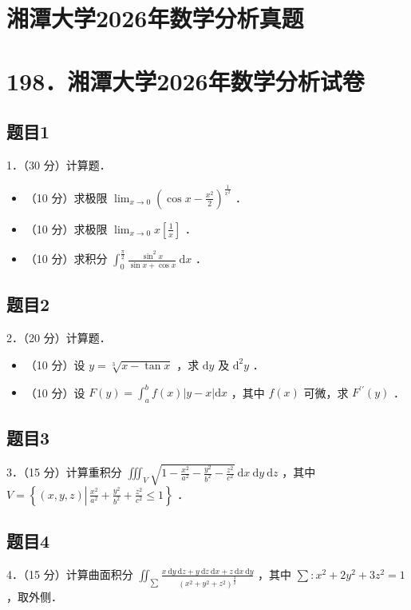 \documentclass{article}
\begin{document}
\section*{湘潭大学2026年数学分析真题}
\section*{198．湘潭大学2026年数学分析试卷}

\subsection{题目1}
1．（30 分）计算题．

\begin{itemize}
  \item[（1）] （10 分）求极限 \(\lim _{x \rightarrow 0}\left(\cos x-\frac{x^{2}}{2}\right)^{\frac{1}{x^{2}}}\) ．
  \item[（2）] （10 分）求极限 \(\lim _{x \rightarrow 0} x\left[\frac{1}{x}\right]\) ．
  \item[（3）] （10 分）求积分 \(\int_{0}^{\frac{\pi}{2}} \frac{\sin ^{2} x}{\sin x+\cos x} \mathrm{~d} x\) ．
\end{itemize}

\subsection{题目2}
2．（20 分）计算题．

\begin{itemize}
  \item[（1）] （10 分）设 \(y=\sqrt[3]{x-\tan x}\) ，求 \(\mathrm{d} y\) 及 \(\mathrm{d}^{2} y\) ．
  \item[（2）] （10 分）设 \(F(y)=\int_{a}^{b} f(x)|y-x| \mathrm{d} x\) ，其中 \(f(x)\) 可微，求 \(F^{\prime \prime}(y)\) ．
\end{itemize}

\subsection{题目3}
3．（15 分）计算重积分 \(\iiint_{V} \sqrt{1-\frac{x^{2}}{a^{2}}-\frac{y^{2}}{b^{2}}-\frac{z^{2}}{c^{2}}} \mathrm{~d} x \mathrm{~d} y \mathrm{~d} z\) ，其中 \(V=\left\{(x, y, z) \left\lvert\, \frac{x^{2}}{a^{2}}+\frac{y^{2}}{b^{2}}+\frac{z^{2}}{c^{2}} \leq 1\right.\right\}\) ．

\subsection{题目4}
4．（15 分）计算曲面积分 \(\iint_{\sum} \frac{x \mathrm{~d} y \mathrm{~d} z+y \mathrm{~d} z \mathrm{~d} x+z \mathrm{~d} x \mathrm{~d} y}{\left(x^{2}+y^{2}+z^{2}\right)^{\frac{3}{2}}}\) ，其中 \(\sum: x^{2}+2 y^{2}+3 z^{2}=1\) ，取外侧．
\end{document}
